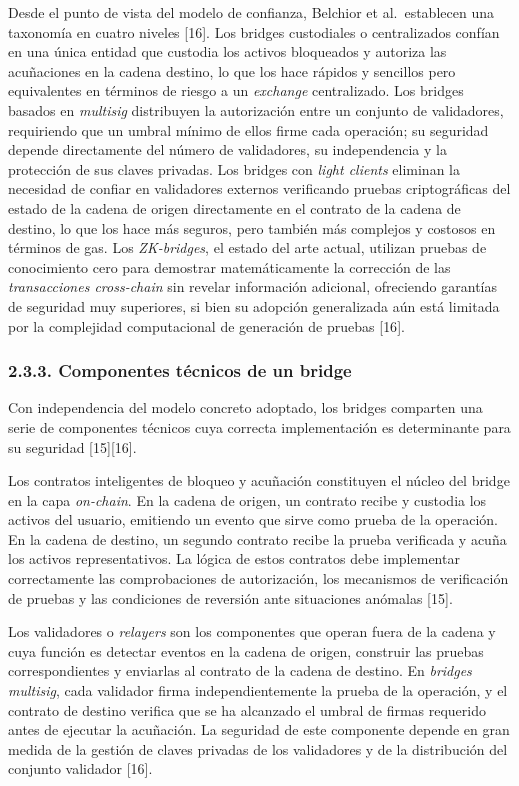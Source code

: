Desde el punto de vista del modelo de confianza, Belchior et
al.~establecen una taxonomía en cuatro niveles {[}16{]}. Los bridges
custodiales o centralizados confían en una única entidad que custodia
los activos bloqueados y autoriza las acuñaciones en la cadena destino,
lo que los hace rápidos y sencillos pero equivalentes en términos de
riesgo a un \emph{exchange} centralizado. Los bridges basados en
\emph{multisig} distribuyen la autorización entre un conjunto de
validadores, requiriendo que un umbral mínimo de ellos firme cada
operación; su seguridad depende directamente del número de validadores,
su independencia y la protección de sus claves privadas. Los bridges con
\emph{light clients} eliminan la necesidad de confiar en validadores
externos verificando pruebas criptográficas del estado de la cadena de
origen directamente en el contrato de la cadena de destino, lo que los
hace más seguros, pero también más complejos y costosos en términos de
gas. Los \emph{ZK-bridges}, el estado del arte actual, utilizan pruebas
de conocimiento cero para demostrar matemáticamente la corrección de las
\emph{transacciones cross-chain} sin revelar información adicional,
ofreciendo garantías de seguridad muy superiores, si bien su adopción
generalizada aún está limitada por la complejidad computacional de
generación de pruebas {[}16{]}.

\subsubsection{2.3.3. Componentes técnicos de un
bridge}\label{componentes-tuxe9cnicos-de-un-bridge}

Con independencia del modelo concreto adoptado, los bridges comparten
una serie de componentes técnicos cuya correcta implementación es
determinante para su seguridad {[}15{]}{[}16{]}.

Los contratos inteligentes de bloqueo y acuñación constituyen el núcleo
del bridge en la capa \emph{on-chain}. En la cadena de origen, un
contrato recibe y custodia los activos del usuario, emitiendo un evento
que sirve como prueba de la operación. En la cadena de destino, un
segundo contrato recibe la prueba verificada y acuña los activos
representativos. La lógica de estos contratos debe implementar
correctamente las comprobaciones de autorización, los mecanismos de
verificación de pruebas y las condiciones de reversión ante situaciones
anómalas {[}15{]}.

Los validadores o \emph{relayers} son los componentes que operan fuera
de la cadena y cuya función es detectar eventos en la cadena de origen,
construir las pruebas correspondientes y enviarlas al contrato de la
cadena de destino. En \emph{bridges multisig}, cada validador firma
independientemente la prueba de la operación, y el contrato de destino
verifica que se ha alcanzado el umbral de firmas requerido antes de
ejecutar la acuñación. La seguridad de este componente depende en gran
medida de la gestión de claves privadas de los validadores y de la
distribución del conjunto validador {[}16{]}.

